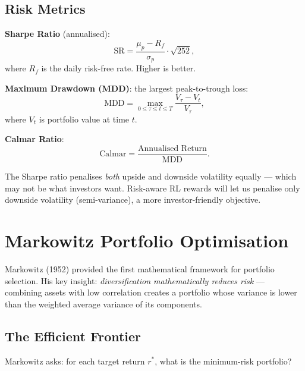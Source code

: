 \documentclass[12pt,a4paper]{article}
\begin{document}
\subsection{Risk Metrics}

\textbf{Sharpe Ratio} (annualised):
\begin{equation}
  \text{SR} = \frac{\mu_p - R_f}{\sigma_p} \cdot \sqrt{252},
  \label{eq:sharpe}
\end{equation}
where $R_f$ is the daily risk-free rate.  Higher is better.

\textbf{Maximum Drawdown (MDD)}: the largest peak-to-trough loss:
\begin{equation}
  \text{MDD} = \max_{0 \le \tau \le t \le T}\!
  \frac{V_\tau - V_t}{V_\tau},
\end{equation}
where $V_t$ is portfolio value at time $t$.

\textbf{Calmar Ratio}:
\begin{equation}
  \text{Calmar} = \frac{\text{Annualised Return}}{\text{MDD}}.
\end{equation}

\begin{finbox}
The Sharpe ratio penalises \emph{both} upside and downside volatility
equally --- which may not be what investors want.  Risk-aware RL rewards
will let us penalise only downside volatility (semi-variance), a more
investor-friendly objective.
\end{finbox}

\section{Markowitz Portfolio Optimisation}

\begin{insbox}
Markowitz (1952) provided the first mathematical framework for portfolio
selection.  His key insight: \emph{diversification mathematically reduces
risk} --- combining assets with low correlation creates a portfolio whose
variance is lower than the weighted average variance of its components.
\end{insbox}

\subsection{The Efficient Frontier}

Markowitz asks: for each target return $r^*$, what is the minimum-risk
portfolio?
\end{document}
